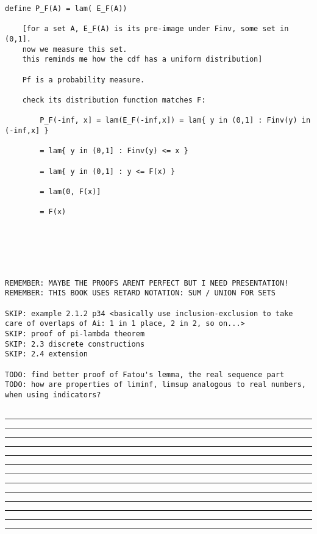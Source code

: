 \documentclass{article}
\begin{document}
\begin{flushleft}
\begin{verbatim}
define P_F(A) = lam( E_F(A))
			
	[for a set A, E_F(A) is its pre-image under Finv, some set in (0,1].
	now we measure this set.
	this reminds me how the cdf has a uniform distribution]
	
	Pf is a probability measure.
	
	check its distribution function matches F:
	
		P_F(-inf, x] = lam(E_F(-inf,x]) = lam{ y in (0,1] : Finv(y) in (-inf,x] }
		
		= lam{ y in (0,1] : Finv(y) <= x }
		
		= lam{ y in (0,1] : y <= F(x) }
		
		= lam(0, F(x)] 
		
		= F(x)
		



			
			
REMEMBER: MAYBE THE PROOFS ARENT PERFECT BUT I NEED PRESENTATION!	
REMEMBER: THIS BOOK USES RETARD NOTATION: SUM / UNION FOR SETS		
		
SKIP: example 2.1.2 p34 <basically use inclusion-exclusion to take care of overlaps of Ai: 1 in 1 place, 2 in 2, so on...>	
SKIP: proof of pi-lambda theorem
SKIP: 2.3 discrete constructions
SKIP: 2.4 extension

TODO: find better proof of Fatou's lemma, the real sequence part 
TODO: how are properties of liminf, limsup analogous to real numbers, when using indicators?


\end{verbatim}

\bigbreak
\hrule
\bigbreak
\textbf{}

\bigbreak
\hrule
\bigbreak
\textbf{}

\bigbreak
\hrule
\bigbreak
\textbf{}

\bigbreak
\hrule
\bigbreak
\textbf{}

\bigbreak
\hrule
\bigbreak
\textbf{}

\bigbreak
\hrule
\bigbreak
\textbf{}

\bigbreak
\hrule
\bigbreak
\textbf{}

\bigbreak
\hrule
\bigbreak
\textbf{}

\bigbreak
\hrule
\bigbreak
\textbf{}

\bigbreak
\hrule
\bigbreak
\textbf{}

\bigbreak
\hrule
\bigbreak
\textbf{}

\bigbreak
\hrule
\bigbreak
\textbf{}

\bigbreak
\hrule
\bigbreak
\textbf{}


\end{flushleft}
\end{document}
